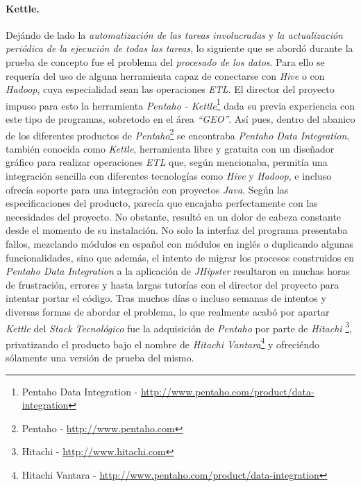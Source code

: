 \par
\paragraph*{Kettle.}

\par
Dejándo de lado la \textit{automatización de las tareas involucradas} y \textit{la actualización periódica de la ejecución de todas las tareas}, lo siguiente que se abordó durante la prueba de concepto fue el problema del \textit{procesado de los datos}. Para ello se requería del uso de alguna herramienta capaz de conectarse con \textit{Hive} o con \textit{Hadoop}, cuya especialidad sean las operaciones \textit{ETL}. El director del proyecto impuso para esto la herramienta \textit{Pentaho - Kettle}\footnote{Pentaho Data Integration - \url{http://www.pentaho.com/product/data-integration}} dada su previa experiencia con este tipo de programas, sobretodo en el área \textit{``GEO''}. Así pues, dentro del abanico de los diferentes productos de \textit{Pentaho}\footnote{Pentaho - \url{http://www.pentaho.com}} se encontraba \textit{Pentaho Data Integration}, también conocida como \textit{Kettle}, herramienta libre y gratuita con un diseñador gráfico para realizar operaciones \textit{ETL} que, según mencionaba, permitía una integración sencilla con diferentes tecnologías como \textit{Hive} y \textit{Hadoop}, e incluso ofrecía soporte para una integración con proyectos \textit{Java}. Según las especificaciones del producto, parecía que encajaba perfectamente con las necesidades del proyecto. No obstante, resultó en un dolor de cabeza constante desde el momento de su instalación. No solo la interfaz del programa presentaba fallos, mezclando módulos en español con módulos en inglés o duplicando algunas funcionalidades, sino que además, el intento de migrar los procesos construidos en \textit{Pentaho Data Integration} a la aplicación de \textit{JHipster} resultaron en muchas horas de frustración, errores y hasta largas tutorías con el director del proyecto para intentar portar el código. Tras muchos días o incluso semanas de intentos y diversas formas de abordar el problema, lo que realmente acabó por apartar \textit{Kettle} del \textit{Stack Tecnológico} fue la adquisición de \textit{Pentaho} por parte de \textit{Hitachi} \footnote{Hitachi - \url{http://www.hitachi.com}}, privatizando el producto bajo el nombre de \textit{Hitachi Vantara}\footnote{Hitachi Vantara - \url{http://www.pentaho.com/product/data-integration}} y ofreciéndo sólamente una versión de prueba del mismo. 


